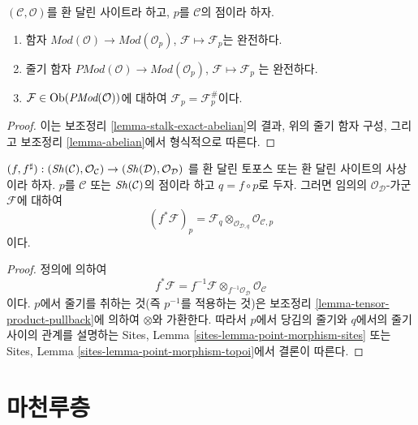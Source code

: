 \begin{lemma}
\label{lemma-stalk-exact-modules}
$(\mathcal{C}, \mathcal{O})$를 환 달린 사이트라 하고,
$p$를 $\mathcal{C}$의 점이라 하자.
\begin{enumerate}
\item 함자
$\textit{Mod}(\mathcal{O}) \to \textit{Mod}(\mathcal{O}_p)$,
$\mathcal{F} \mapsto \mathcal{F}_p$는 완전하다.
\item 줄기 함자
$\textit{PMod}(\mathcal{O}) \to \textit{Mod}(\mathcal{O}_p)$,
$\mathcal{F} \mapsto \mathcal{F}_p$
는 완전하다.
\item $\mathcal{F} \in \mathop{\mathrm{Ob}}\nolimits(\textit{PMod}(\mathcal{O}))$에 대하여
$\mathcal{F}_p = \mathcal{F}^\#_p$이다.
\end{enumerate}
\end{lemma}

\begin{proof}
이는 보조정리 \ref{lemma-stalk-exact-abelian}의 결과, 위의 줄기 함자 구성,
그리고 보조정리 \ref{lemma-abelian}에서 형식적으로 따른다.
\end{proof}

\begin{lemma}
\label{lemma-pullback-stalk}
$(f, f^\sharp) :
(\mathop{\mathit{Sh}}\nolimits(\mathcal{C}), \mathcal{O}_\mathcal{C})
\to
(\mathop{\mathit{Sh}}\nolimits(\mathcal{D}), \mathcal{O}_\mathcal{D})$
를 환 달린 토포스 또는 환 달린 사이트의 사상이라 하자.
$p$를 $\mathcal{C}$ 또는 $\mathop{\mathit{Sh}}\nolimits(\mathcal{C})$의 점이라 하고
$q = f \circ p$로 두자. 그러면 임의의 $\mathcal{O}_\mathcal{D}$-가군
$\mathcal{F}$에 대하여
$$
(f^*\mathcal{F})_p =
\mathcal{F}_q \otimes_{\mathcal{O}_{\mathcal{D}, q}}
\mathcal{O}_{\mathcal{C}, p}
$$
이다.
\end{lemma}

\begin{proof}
정의에 의하여
$$
f^*\mathcal{F} =
f^{-1}\mathcal{F} \otimes_{f^{-1}\mathcal{O}_\mathcal{D}}
\mathcal{O}_\mathcal{C}
$$
이다. $p$에서 줄기를 취하는 것(즉 $p^{-1}$를 적용하는 것)은 보조정리
\ref{lemma-tensor-product-pullback}에 의하여 $\otimes$와 가환한다.
따라서 $p$에서 당김의 줄기와 $q$에서의 줄기 사이의 관계를 설명하는
Sites, Lemma \ref{sites-lemma-point-morphism-sites} 또는 Sites, Lemma
\ref{sites-lemma-point-morphism-topoi}에서 결론이 따른다.
\end{proof}






\section{마천루층}
\label{section-skyscraper}

